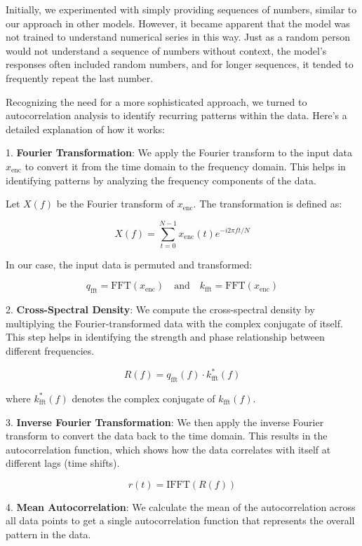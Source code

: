 Initially, we experimented with simply providing sequences of numbers, similar to our approach in other models. However, it became apparent that the model was not trained to understand numerical series in this way. Just as a random person would not understand a sequence of numbers without context, the model's responses often included random numbers, and for longer sequences, it tended to frequently repeat the last number.

Recognizing the need for a more sophisticated approach, we turned to autocorrelation analysis to identify recurring patterns within the data. Here’s a detailed explanation of how it works:

1. \textbf{Fourier Transformation}: We apply the Fourier transform to the input data \( x_{\text{enc}} \) to convert it from the time domain to the frequency domain. This helps in identifying patterns by analyzing the frequency components of the data.

Let \( X(f) \) be the Fourier transform of \( x_{\text{enc}} \). The transformation is defined as:

\[
	X(f) = \sum_{t=0}^{N-1} x_{\text{enc}}(t) e^{-i 2 \pi f t / N}
\]

In our case, the input data is permuted and transformed:

\[
	q_{\text{fft}} = \text{FFT}(x_{\text{enc}}) \quad \text{and} \quad k_{\text{fft}} = \text{FFT}(x_{\text{enc}})
\]

2. \textbf{Cross-Spectral Density}: We compute the cross-spectral density by multiplying the Fourier-transformed data with the complex conjugate of itself. This step helps in identifying the strength and phase relationship between different frequencies.

\[
	R(f) = q_{\text{fft}}(f) \cdot k_{\text{fft}}^*(f)
\]

where \( k_{\text{fft}}^*(f) \) denotes the complex conjugate of \( k_{\text{fft}}(f) \).

3. \textbf{Inverse Fourier Transformation}: We then apply the inverse Fourier transform to convert the data back to the time domain. This results in the autocorrelation function, which shows how the data correlates with itself at different lags (time shifts).

\[
	r(t) = \text{IFFT}(R(f))
\]

4. \textbf{Mean Autocorrelation}: We calculate the mean of the autocorrelation across all data points to get a single autocorrelation function that represents the overall pattern in the data.

